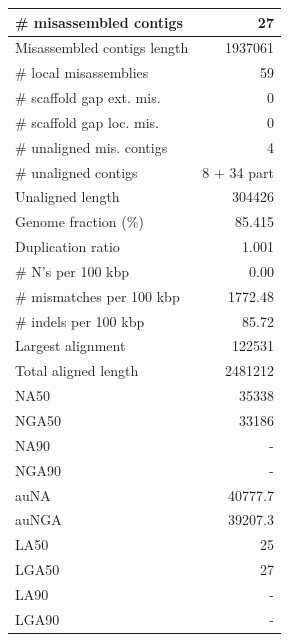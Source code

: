 \documentclass[12pt,a4paper]{article}
\begin{document}
\begin{table}[ht]
\begin{center}
\begin{tabular}{|l*{1}{|r}|}
\# misassembled contigs & 27 \\ \hline
Misassembled contigs length & 1937061 \\ \hline
\# local misassemblies & 59 \\ \hline
\# scaffold gap ext. mis. & 0 \\ \hline
\# scaffold gap loc. mis. & 0 \\ \hline
\# unaligned mis. contigs & 4 \\ \hline
\# unaligned contigs & 8 + 34 part \\ \hline
Unaligned length & 304426 \\ \hline
Genome fraction (\%) & 85.415 \\ \hline
Duplication ratio & 1.001 \\ \hline
\# N's per 100 kbp & 0.00 \\ \hline
\# mismatches per 100 kbp & 1772.48 \\ \hline
\# indels per 100 kbp & 85.72 \\ \hline
Largest alignment & 122531 \\ \hline
Total aligned length & 2481212 \\ \hline
NA50 & 35338 \\ \hline
NGA50 & 33186 \\ \hline
NA90 & - \\ \hline
NGA90 & - \\ \hline
auNA & 40777.7 \\ \hline
auNGA & 39207.3 \\ \hline
LA50 & 25 \\ \hline
LGA50 & 27 \\ \hline
LA90 & - \\ \hline
LGA90 & - \\ \hline
\end{tabular}
\end{center}
\end{table}
\end{document}
